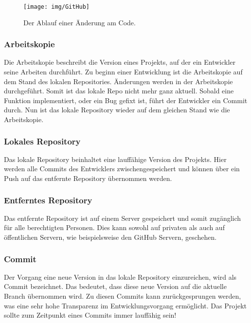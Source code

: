 \documentclass[FIPLY_base.tex]{subfiles}
\begin{document}
\newpage
\begin{wrapfigure}{r}{0.20\textwidth}
\begin{center}
	\texttt{[image: img/GitHub]}
	\caption{Der Ablauf einer Änderung am Code.}
	\vspace{-90pt}
\end{center}
\end{wrapfigure}

\subsubsection{Arbeitskopie}
Die Arbeitskopie beschreibt die Version eines Projekts, auf der ein Entwickler seine Arbeiten durchführt.
Zu beginn einer Entwicklung ist die Arbeitskopie auf dem Stand des lokalen Repositories.
Änderungen werden in der Arbeitskopie durchgeführt. Somit ist das lokale Repo nicht mehr ganz aktuell.
Sobald eine Funktion implementiert, oder ein Bug gefixt ist, führt der Entwickler ein Commit durch.
Nun ist das lokale Repository wieder auf dem gleichen Stand wie die Arbeitskopie.

\subsubsection{Lokales Repository}
Das lokale Repository beinhaltet eine lauffähige Version des Projekts.
Hier werden alle Commits des Entwicklers zwischengespeichert und können über ein Push auf das entfernte Repository übernommen werden.

\subsubsection{Entferntes Repository}
Das entfernte Repository ist auf einem Server gespeichert und somit zugänglich für alle berechtigten Personen.
Dies kann sowohl auf privaten als auch auf öffentlichen Servern, wie beispielsweise den GitHub Servern, geschehen.

\subsubsection{Commit}
Der Vorgang eine neue Version in das lokale Repository einzureichen, wird als Commit bezeichnet.
Das bedeutet, dass diese neue Version auf die aktuelle Branch übernommen wird.
Zu diesen Commits kann zurückgesprungen werden, was eine sehr hohe Transparenz im Entwicklungsvorgang ermöglicht.
Das Projekt sollte zum Zeitpunkt eines Commits immer lauffähig sein! 
 
\end{document}
